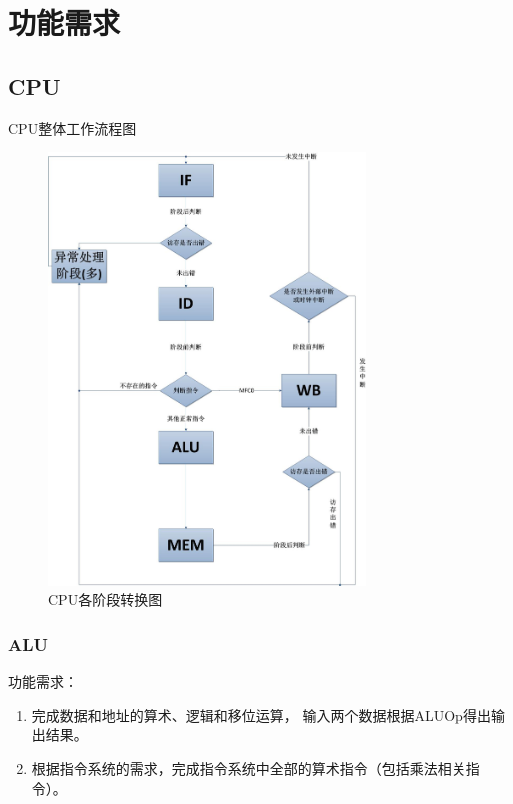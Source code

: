 \section{功能需求}
    \subsection{CPU}
        CPU整体工作流程图
        \begin{figure}[!hbp]
            \centering
            \caption{CPU各阶段转换图}
            \includegraphics[width=0.75\textwidth]{chart/Stages.jpg}
        \end{figure}
                
        \subsubsection{ALU}
            功能需求：
            \begin{enumerate}
            \item
            完成数据和地址的算术、逻辑和移位运算，%
            输入两个数据根据ALUOp得出输出结果。
            \item
            根据指令系统的需求，完成指令系统中全部的算术指令（包括乘法相关指令）。
            \end{enumerate}

